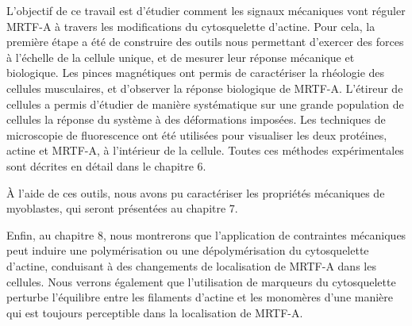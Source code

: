 \documentclass[10pt,twoside]{report}
\begin{document}
  L'objectif de ce travail est d'étudier comment les signaux mécaniques vont réguler MRTF-A à travers les modifications du cytosquelette d'actine. Pour cela, la première étape a été de construire des outils nous permettant d'exercer des forces à l'échelle de la cellule unique, et de mesurer leur réponse mécanique et biologique. Les pinces magnétiques ont permis de caractériser la rhéologie des cellules musculaires, et d'observer la réponse biologique de MRTF-A. L'étireur de cellules a permis d'étudier de manière systématique sur une grande population de cellules la réponse du système à des déformations imposées. Les techniques de microscopie de fluorescence ont été utilisées pour visualiser les deux protéines, actine et MRTF-A, à l'intérieur de la cellule. Toutes ces méthodes expérimentales sont décrites en détail dans le chapitre 6. 
  
  À l'aide de ces outils, nous avons pu caractériser les propriétés mécaniques de myoblastes, qui seront présentées au chapitre 7. 
  
  Enfin, au chapitre 8, nous montrerons que l'application de contraintes mécaniques peut induire une polymérisation ou une dépolymérisation du cytosquelette d'actine, conduisant à des changements de localisation de MRTF-A dans les cellules. Nous verrons également que l'utilisation de marqueurs du cytosquelette perturbe l'équilibre entre les filaments d'actine et les monomères d'une manière qui est toujours perceptible dans la localisation de MRTF-A. 
\end{document}
